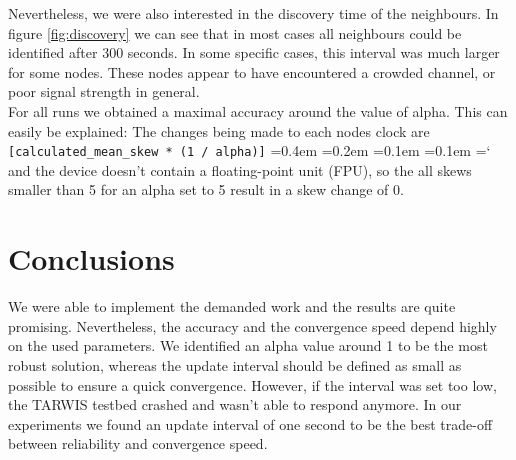 \documentclass{llncs}
\newcommand{\code}[1]{%
	\texttt{#1}%
	\fontdimen2\font=0.4em
	\fontdimen3\font=0.2em
	\fontdimen4\font=0.1em
	\fontdimen7\font=0.1em
	\hyphenchar\font=`\-
}
\begin{document}
\noindent Nevertheless, we were also interested in the discovery time of the neighbours. In figure \ref{fig:discovery} we can see that in most cases all neighbours could be identified after 300 seconds. In some specific cases, this interval was much larger for some nodes. These nodes appear to have encountered a crowded channel, or poor signal strength in general.\\



\noindent For all runs we obtained a maximal accuracy around the value of alpha. This can easily be explained: The changes being made to each nodes clock are \code{[calculated\_mean\_skew * (1 / alpha)]} and the device doesn't contain a floating-point unit (FPU), so the all skews smaller than 5 for an alpha set to 5 result in a skew change of 0.


\section{Conclusions}

We were able to implement the demanded work and the results are quite promising. Nevertheless, the accuracy and the convergence speed depend highly on the used parameters. We identified an alpha value around 1 to be the most robust solution, whereas the update interval should be defined as small as possible to ensure a quick convergence. However, if the interval was set too low, the TARWIS testbed crashed and wasn't able to respond anymore. In our experiments we found an update interval of one second to be the best trade-off between reliability and convergence speed. 

{}



%
%
\end{document}
